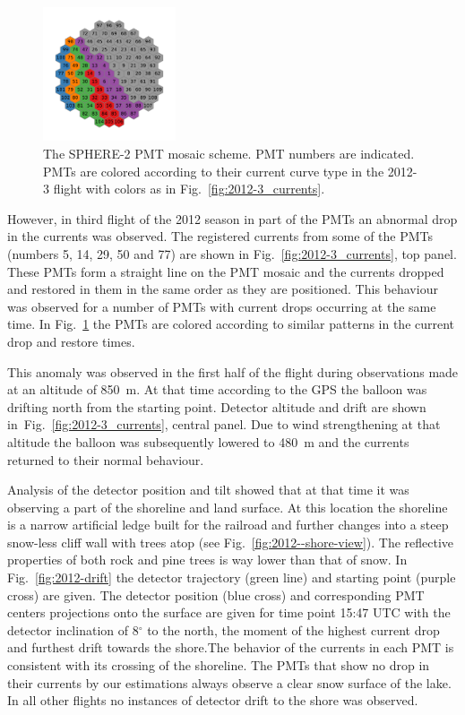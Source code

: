 \documentclass[preprint,5p,times]{elsarticle}
\begin{document}
\begin{figure}[tb]
\centering
    \includegraphics[width=0.35\textwidth]{2012-3_retina_all.pdf}
    \caption{The SPHERE-2 PMT mosaic scheme. PMT numbers are indicated. PMTs are colored according to their current curve type in the 2012-3 flight with colors as in Fig.~\ref{fig:2012-3_currents}.}
    \label{fig:2012-3_shore_image}
\end{figure}

However, in third flight of the 2012 season in part of the PMTs an abnormal drop in the currents was observed.
The registered currents from some of the PMTs (numbers 5, 14, 29, 50 and 77) are shown in Fig.~\ref{fig:2012-3_currents}, top panel. These PMTs form a straight line on the PMT mosaic and the currents dropped and restored in them in the same order as they are positioned. This behaviour was observed for a number of PMTs with current drops occurring at the same time. In Fig.~\ref{fig:2012-3_shore_image} the PMTs are colored according to similar patterns in the current drop and restore times.

This anomaly was observed in the first half of the flight during observations made at an altitude of 850~m. At that time according to the GPS the balloon was drifting north from the starting point. Detector altitude and drift are shown in~Fig.~\ref{fig:2012-3_currents}, central panel. Due to wind strengthening at that altitude the balloon was subsequently lowered to 480~m and the currents returned to their normal behaviour. 

Analysis of the detector position and tilt showed that at that time it was observing a part of the shoreline and land surface. At this location the shoreline is a narrow artificial ledge built for the railroad and further changes into a steep snow-less cliff wall with trees atop (see Fig.~\ref{fig:2012--shore-view}). The reflective properties of both rock and pine trees is way lower than that of snow. In Fig.~\ref{fig:2012-drift} the detector trajectory (green line) and starting point (purple cross) are given. The detector position (blue cross) and corresponding PMT centers projections onto the surface are given for time point 15:47 UTC with the detector inclination of 8$^\circ$ to the north, the moment of the highest current drop and furthest drift towards the shore.The behavior of the currents in each PMT is consistent with its crossing of the shoreline. The PMTs that show no drop in their currents by our estimations always observe a clear snow surface of the lake. In all other flights no instances of detector drift to the shore was observed. 
\end{document}

